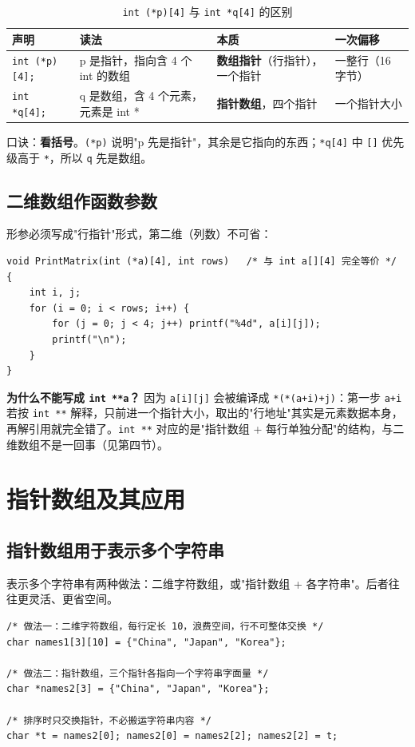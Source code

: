 \begin{table}[htbp]
\centering
\caption{\texttt{int (*p)[4]} 与 \texttt{int *q[4]} 的区别}
\footnotesize
\begin{tabularx}{\textwidth}{@{}p{3.2cm}p{2.6cm}p{2.6cm}X@{}}
\toprule
声明 & 读法 & 本质 & 一次偏移 \\
\midrule
\texttt{int (*p)[4];} & p 是指针，指向含 4 个 int 的数组 & \textbf{数组指针}（行指针），一个指针 & 一整行（16 字节） \\
\texttt{int *q[4];} & q 是数组，含 4 个元素，元素是 int * & \textbf{指针数组}，四个指针 & 一个指针大小 \\
\bottomrule
\end{tabularx}
\end{table}

口诀：\textbf{看括号}。\texttt{(*p)} 说明"p 先是指针"，其余是它指向的东西；\texttt{*q[4]} 中 \texttt{[]} 优先级高于 \texttt{*}，所以 \texttt{q} 先是数组。

\subsection{二维数组作函数参数}
形参必须写成"行指针"形式，第二维（列数）不可省：
\begin{lstlisting}
void PrintMatrix(int (*a)[4], int rows)   /* 与 int a[][4] 完全等价 */
{
    int i, j;
    for (i = 0; i < rows; i++) {
        for (j = 0; j < 4; j++) printf("%4d", a[i][j]);
        printf("\n");
    }
}
\end{lstlisting}
\textbf{为什么不能写成 \texttt{int **a}？} 因为 \texttt{a[i][j]} 会被编译成 \texttt{*(*(a+i)+j)}：第一步 \texttt{a+i} 若按 \texttt{int **} 解释，只前进一个指针大小，取出的"行地址"其实是元素数据本身，再解引用就完全错了。\texttt{int **} 对应的是"指针数组 + 每行单独分配"的结构，与二维数组不是一回事（见第四节）。


\section{指针数组及其应用}
\subsection{指针数组用于表示多个字符串}
表示多个字符串有两种做法：二维字符数组，或"指针数组 + 各字符串"。后者往往更灵活、更省空间。
\begin{lstlisting}
/* 做法一：二维字符数组，每行定长 10，浪费空间，行不可整体交换 */
char names1[3][10] = {"China", "Japan", "Korea"};

/* 做法二：指针数组，三个指针各指向一个字符串字面量 */
char *names2[3] = {"China", "Japan", "Korea"};

/* 排序时只交换指针，不必搬运字符串内容 */
char *t = names2[0]; names2[0] = names2[2]; names2[2] = t;
\end{lstlisting}


